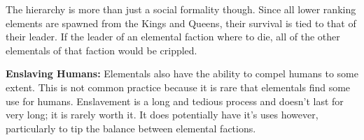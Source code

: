 \documentclass[blue]{elementals}
\begin{document}
The hierarchy is more than just a social formality though. Since all lower ranking elements are spawned from the Kings and Queens, their survival is tied to that of their leader. If the leader of an elemental faction where to die, all of the other elementals of that faction would be crippled.

{\bf Enslaving Humans:}
Elementals also have the ability to compel humans to some extent. This is not common practice because it is rare that elementals find some use for humans. Enslavement is a long and tedious process and doesn't last for very long; it is rarely worth it. It does potentially have it's uses however, particularly to tip the balance between elemental factions.
\end{document}
